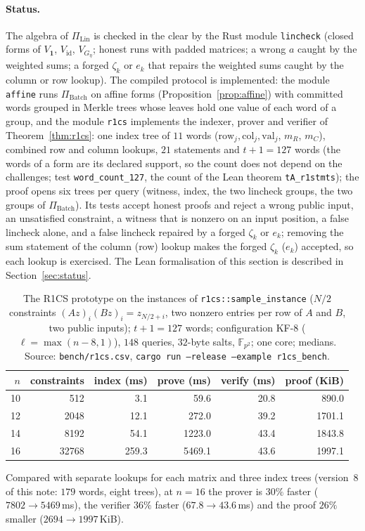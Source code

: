 \documentclass[11pt]{article}
\theoremstyle{definition}
\newcommand{\F}{\mathbb{F}}
\begin{document}
\paragraph{Status.} The algebra of $\Pi_{\mathrm{Lin}}$ is checked in the clear by the Rust module \texttt{lincheck} (closed forms of $V_{\mathbf 1}$, $V_{\mathrm{id}}$, $V_{G_\eta}$; honest runs with padded matrices; a wrong $a$ caught by the weighted sums; a forged $\zeta_k$ or $e_k$ that repairs the weighted sums caught by the column or row lookup).
The compiled protocol is implemented: the module \texttt{affine} runs $\Pi_{\mathrm{Batch}}$ on affine forms (Proposition~\ref{prop:affine}) with committed words grouped in Merkle trees whose leaves hold one value of each word of a group, and the module \texttt{r1cs} implements the indexer, prover and verifier of Theorem~\ref{thm:r1cs}: one index tree of $11$ words ($\mathrm{row}_j,\mathrm{col}_j,\mathrm{val}_j$, $m_R$, $m_C$), combined row and column lookups, $21$ statements and $t+1=127$ words (the words of a form are its declared support, so the count does not depend on the challenges; test \texttt{word\_count\_127}, the count of the Lean theorem \texttt{tA\_r1stmts}); the proof opens six trees per query (witness, index, the two lincheck groups, the two groups of $\Pi_{\mathrm{Batch}}$). Its tests accept honest proofs and reject a wrong public input, an unsatisfied constraint, a witness that is nonzero on an input position, a false lincheck alone, and a false lincheck repaired by a forged $\zeta_k$ or $e_k$; removing the sum statement of the column (row) lookup makes the forged $\zeta_k$ ($e_k$) accepted, so each lookup is exercised.
The Lean formalisation of this section is described in Section~\ref{sec:status}.

\begin{table}[h]
\centering\small
\begin{tabular}{r r r r r r}
\hline
$n$ & constraints & index (ms) & prove (ms) & verify (ms) & proof (KiB)\\
\hline
10 & 512 & 3.1 & 59.6 & 20.8 & 890.0\\
12 & 2048 & 12.1 & 272.0 & 39.2 & 1701.1\\
14 & 8192 & 54.1 & 1223.0 & 43.4 & 1843.8\\
16 & 32768 & 259.3 & 5469.1 & 43.6 & 1997.1\\
\hline
\end{tabular}
\caption{The R1CS prototype on the instances of \texttt{r1cs::sample\_instance} ($N/2$ constraints $(Az)_i(Bz)_i=z_{N/2+i}$, two nonzero entries per row of $A$ and $B$, two public inputs); $t+1=127$ words; configuration KF-8 ($\ell=\max(n-8,1)$), $148$ queries, $32$-byte salts, $\F_{p^2}$; one core; medians. Source: \texttt{bench/r1cs.csv}, \texttt{cargo run --release --example r1cs\_bench}.}
\end{table}
Compared with separate lookups for each matrix and three index trees (version~8 of this note: $179$ words, eight trees), at $n=16$ the prover is $30\%$ faster ($7802\to5469$\,ms), the verifier $36\%$ faster ($67.8\to43.6$\,ms) and the proof $26\%$ smaller ($2694\to1997$\,KiB).
\end{document}
